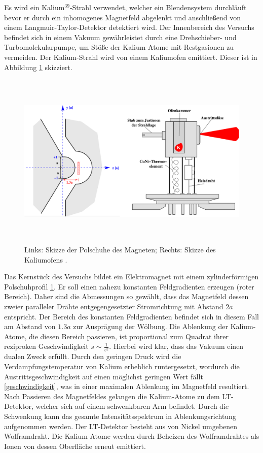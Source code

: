 Es wird ein Kalium$^{39}$-Strahl verwendet, welcher ein Blendensystem durchläuft bevor er durch ein inhomogenes Magnetfeld abgelenkt und anschließend von einem Langmuir-Taylor-Detektor detektiert wird.
Der Innenbereich des Versuchs befindet sich in einem Vakuum gewährleistet durch eine Drehschieber- und Turbomolekularpumpe, um Stöße der Kalium-Atome mit Restgasionen zu vermeiden.
Der Kalium-Strahl wird von einem Kaliumofen emittiert.
Dieser ist in Abbildung \ref{fig:aufbau2} skizziert.
\begin{figure}
  \centering
  \includegraphics[height=8.5cm]{ressources/aufbau2.png}
  \caption{Links: Skizze der Polschuhe des Magneten; Rechts: Skizze des Kaliumofens \cite{skript}.}
  \label{fig:aufbau2}
\end{figure}
Das Kernstück des Versuchs bildet ein Elektromagnet mit einem zylinderförmigen Polschuhprofil \ref{fig:aufbau2}.
Er soll einen nahezu konstanten Feldgradienten erzeugen (roter Bereich).
Daher sind die Abmessungen so gewählt, dass das Magnetfeld dessen zweier paralleler Drähte entgegengesetzter Stromrichtung mit Abstand $2a$ entspricht.
Der Bereich des konstanten Feldgradienten befindet sich in diesem Fall am Abstand von $1.3a$ zur Ausprägung der Wölbung.
Die Ablenkung der Kalium-Atome, die diesen Bereich passieren, ist proportional zum Quadrat ihrer reziproken Geschwindigkeit $s\sim \frac{1}{v^2}$.
Hierbei wird klar, dass das Vakuum einen dualen Zweck erfüllt.
Durch den geringen Druck wird die Verdampfungstemperatur von Kalium erheblich runtergesetzt, wordurch die Austrittsgeschwindigkeit auf einen möglichst geringen Wert fällt \eqref{geschwindigkeit}, was in einer maximalen Ablenkung im Magnetfeld resultiert.\\
Nach Passieren des Magnetfeldes gelangen die Kalium-Atome zu dem LT-Detektor, welcher sich auf einem schwenkbaren Arm befindet.
Durch die Schwenkung kann das gesamte Intensitätsspektrum in Ablenkungsrichtung aufgenommen werden.
Der LT-Detektor besteht aus von Nickel umgebenen Wolframdraht.
Die Kalium-Atome werden durch Beheizen des Wolframdrahtes als Ionen von dessen Oberfläche erneut emittiert.
